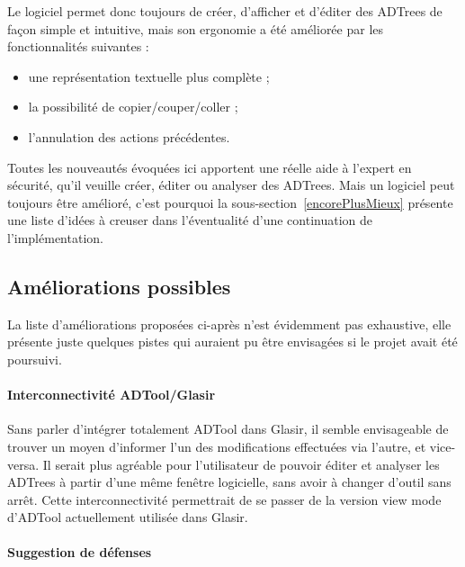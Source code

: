 Le logiciel permet donc toujours de créer, d'afficher et d'éditer des ADTrees de façon simple et intuitive, mais son ergonomie a été améliorée par les fonctionnalités suivantes :
\begin{itemize}
	\item une représentation textuelle plus complète ;
	\item la possibilité de copier/couper/coller ;
	\item l'annulation des actions précédentes.
\end{itemize}

Toutes les nouveautés évoquées ici apportent une réelle aide à l'expert en sécurité, qu'il veuille créer, éditer ou analyser des ADTrees. Mais un logiciel peut toujours être amélioré, c'est pourquoi la {\sc sous-section}~\ref{encorePlusMieux} présente une liste d'idées à creuser dans l'éventualité d'une continuation de l'implémentation.

\subsection{Améliorations possibles}
\label{subsec:encorePlusMieux}

La liste d'améliorations proposées ci-après n'est évidemment pas exhaustive, elle présente juste quelques pistes qui auraient pu être envisagées si le projet avait été poursuivi.

\paragraph{Interconnectivité ADTool/Glasir} Sans parler d'intégrer totalement ADTool dans Glasir, il semble envisageable de trouver un moyen d'informer l'un des modifications effectuées via l'autre, et vice-versa. Il serait plus agréable pour l'utilisateur de pouvoir éditer et analyser les ADTrees à partir d'une même fenêtre logicielle, sans avoir à changer d'outil sans arrêt. Cette interconnectivité permettrait de se passer de la version \og view mode \fg{} d'ADTool actuellement utilisée dans Glasir. 

\paragraph{Suggestion de défenses}